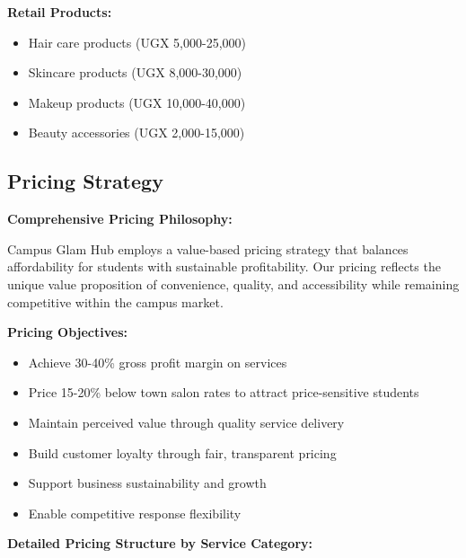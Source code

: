 \textbf{Retail Products:}
\begin{itemize}[leftmargin=2em]
    \item Hair care products (UGX 5,000-25,000)
    \item Skincare products (UGX 8,000-30,000)
    \item Makeup products (UGX 10,000-40,000)
    \item Beauty accessories (UGX 2,000-15,000)
\end{itemize}

\subsection{Pricing Strategy}

\textbf{Comprehensive Pricing Philosophy:}

Campus Glam Hub employs a value-based pricing strategy that balances affordability for students with sustainable profitability. Our pricing reflects the unique value proposition of convenience, quality, and accessibility while remaining competitive within the campus market.

\textbf{Pricing Objectives:}
\begin{itemize}[leftmargin=2em]
    \item Achieve 30-40\% gross profit margin on services
    \item Price 15-20\% below town salon rates to attract price-sensitive students
    \item Maintain perceived value through quality service delivery
    \item Build customer loyalty through fair, transparent pricing
    \item Support business sustainability and growth
    \item Enable competitive response flexibility
\end{itemize}

\vspace{1em}

\textbf{Detailed Pricing Structure by Service Category:}

